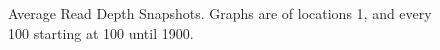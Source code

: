 \documentclass[../main.tex]{subfiles}
\begin{document}
\begin{figure}[H]
\begin{centering}
		\begin{singlespace}
			\vspace{-0.5cm}
			\caption[Average Read Depth Snapshots]{Average Read Depth Snapshots. Graphs are of locations 1, and every 100 starting at 100 until 1900.}\label{avg_rd_snpsht_1}
		\end{singlespace}
	\end{centering}
\end{figure}
\end{document}
